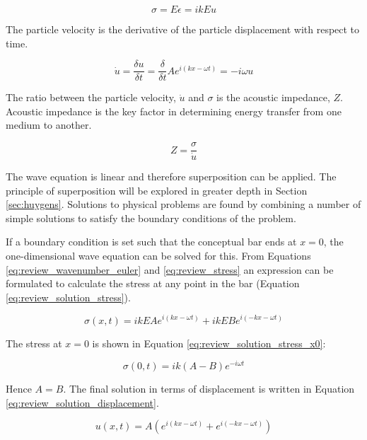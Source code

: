 \begin{equation} \label{eq:review_stress}
\sigma = E \epsilon = ikEu
\end{equation}

The particle velocity is the derivative of the particle displacement with respect to time.

\begin{equation} \label{eq:review_particlevel}
\dot{u} = \frac{\delta u}{\delta t} = \frac{\delta}{\delta t} Ae^{i(kx-\omega t)} = -i \omega u
 \end{equation}

The ratio between the particle velocity, $\dot{u}$ and $\sigma$ is the acoustic impedance, $Z$. Acoustic impedance is the key factor in determining energy transfer from one medium to another.

\begin{equation} \label{eq:review_acoustic_impedence}
Z = \frac{\sigma}{\dot{u}}
\end{equation}

The wave equation is linear and therefore superposition can be applied. The principle of superposition will be explored in greater depth in Section \ref{sec:huygens}. Solutions to physical problems are found by combining a number of simple solutions to satisfy the boundary conditions of the problem.

If a boundary condition is set such that the conceptual bar ends at $x=0$, the one-dimensional wave equation can be solved for this. From Equations \ref{eq:review_wavenumber_euler} and \ref{eq:review_stress} an expression can be formulated to calculate the stress at any point in the bar (Equation \ref{eq:review_solution_stress}). 

\begin{equation} \label{eq:review_solution_stress}
\sigma(x,t) = ikEAe^{i(kx-\omega t)} + ikEBe^{i(-kx-\omega t)}
 \end{equation}

The stress at $x=0$ is shown in Equation \ref{eq:review_solution_stress_x0}:

\begin{equation} \label{eq:review_solution_stress_x0}
\sigma(0,t) = ik(A - B)e^{-i \omega t}
 \end{equation}

Hence $A=B$. The final solution in terms of displacement is written in Equation \ref{eq:review_solution_displacement}\cite{feldman_derivation_2000}.

\begin{equation} \label{eq:review_solution_displacement}
u(x,t) = A(e^{i(kx-\omega t)} + e^{i(-kx-\omega t)})
 \end{equation}

